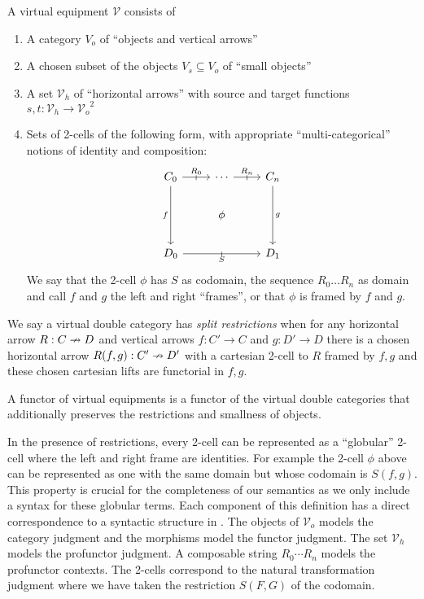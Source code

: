 \documentclass{llncs}
\begin{document}
\begin{definition}
  A virtual equipment $\mathcal V$ consists of
  \begin{enumerate}
  \item A category $V_o$ of ``objects and vertical arrows''
  \item A chosen subset of the objects $V_s \subseteq V_o$ of ``small objects''
  \item A set ${\mathcal V}_h$ of ``horizontal arrows'' with source
    and target functions $s,t : {\mathcal V}_h \to {\mathcal V_o}^2$
  \item Sets of 2-cells of the following form, 
    with appropriate ``multi-categorical'' notions of identity and
    composition:
\[\begin{tikzcd}%
	{C_0} & \cdots & {C_{n}} \\
	& \phi \\
	{D_0} && {D_1}
	\arrow["{R_n}", "\shortmid"{marking}, from=1-2, to=1-3]
	\arrow["f"', from=1-1, to=3-1]
	\arrow["g", from=1-3, to=3-3]
	\arrow["S"', "\shortmid"{marking}, from=3-1, to=3-3]
	\arrow["{R_0}", "\shortmid"{marking}, from=1-1, to=1-2]
\end{tikzcd}\]
    We say that the 2-cell $\phi$ has $S$ as codomain, the sequence
    $R_0 \ldots R_n$ as domain and call $f$ and $g$ the left and right
    ``frames'', or that $\phi$ is framed by $f$ and $g$.
  \end{enumerate}
  We say a virtual double category has \emph{split restrictions} when
  for any horizontal arrow $R : C \nrightarrow D$ and vertical arrows $f : C'
  \to C$ and $g : D' \to D$ there is a chosen horizontal arrow $R(f,g)
  : C' \nrightarrow D'$ with a cartesian 2-cell to $R$ framed by $f,g$ and
  these chosen cartesian lifts are functorial in $f,g$.
  
  A functor of virtual equipments is a functor of the virtual double
  categories that additionally preserves the restrictions and
  smallness of objects.
\end{definition}

In the presence of restrictions, every 2-cell can be represented as a
``globular'' 2-cell where the left and right frame are identities. For
example the 2-cell $\phi$ above can be represented as one with the
same domain but whose codomain is $S(f,g)$. This property is crucial
for the completeness of our semantics as we only include a syntax for these globular terms.
%
Each component of this definition has a direct correspondence to a
syntactic structure in \ohol{}. The objects of $\mathcal V_o$ models
the category judgment and the morphisms model the functor
judgment. The set $\mathcal V_h$ models the profunctor judgment. A
composable string $R_0 \cdots R_n$ models the profunctor contexts. The
2-cells correspond to the natural transformation judgment where we
have taken the restriction $S(F,G)$ of the codomain.
\end{document}
